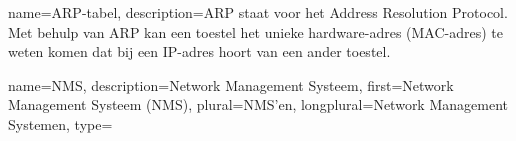 
{
	name=ARP-tabel,
	description={ARP staat voor het Address Resolution Protocol.
				Met behulp van ARP kan een toestel het unieke hardware-adres (MAC-adres) te weten komen dat bij een IP-adres hoort van een ander toestel.\cite{arp-nlwiki}}
}





{
	name=NMS,
	description={Network Management Systeem},
	first={Network Management Systeem (NMS)},
	plural=NMS'en,
	longplural={Network Management Systemen},
	type=\acronymtype
}